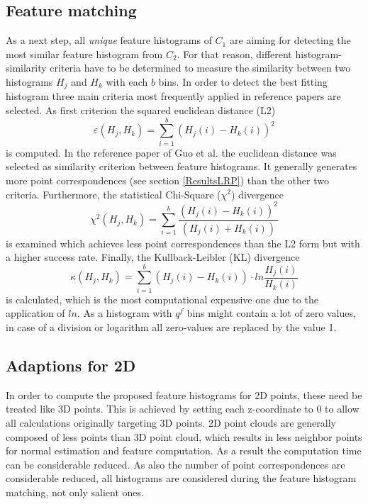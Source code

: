 \subsection{Feature matching}
\label{histogramCriteria}
As a next step, all \textit{unique} feature histograms of $C_1$ are aiming for detecting the most similar feature histogram from $C_2$. For that reason, different histogram-similarity criteria have to be determined to measure the similarity between two histograms $H_j$ and $H_k$ with each $b$ bins. In order to detect the best fitting histogram three main criteria most frequently applied in reference papers \cite{surfletPairRelation} \cite{localFeatureHistograms} are selected. As first criterion the squared euclidean distance (L2)
\begin{equation}
\varepsilon(H_j, H_k) = \displaystyle\sum_{i=1}^{b}(H_j(i) - H_k(i))^2
\end{equation}
is computed. In the reference paper of Guo et al. \cite{guo2016correspondence} the euclidean distance was selected as similarity criterion between feature histograms. It generally generates more point correspondences (see section \ref{ResultsLRP}) than the other two criteria. Furthermore, the statistical Chi-Square ($\chi^2$) divergence
\begin{equation}
\chi^2(H_j, H_k) = \displaystyle\sum_{i=1}^{b}\frac{(H_j(i) - H_k(i))^2}{(H_j(i) + H_k(i))}
\end{equation}
is examined which achieves less point correspondences than the L2 form but with a higher success rate. Finally, the Kullback-Leibler (KL) divergence
\begin{equation}
\kappa(H_j, H_k) = \displaystyle\sum_{i=1}^{b}(H_j(i) - H_k(i)) \cdot ln \frac{H_j(i)}{H_k(i)}
\end{equation}
is calculated, which is the most computational expensive one due to the application of $ln$. As a histogram with $q^f$ bins might contain a lot of zero values, in case of a division or logarithm all zero-values are replaced by the value 1.

\subsection{Adaptions for 2D}
\label{adaptions}
In order to compute the proposed feature histograms for 2D points, these need be treated like 3D points. This is achieved by setting each z-coordinate to 0 to allow all calculations originally targeting 3D points. 
2D point clouds are generally composed of less points than 3D point cloud, which results in less neighbor points for normal estimation and feature computation. As a result the computation time can be considerable reduced. 
As also the number of point correspondences are considerable reduced, all histograms are considered during the feature histogram matching, not only salient ones. 

